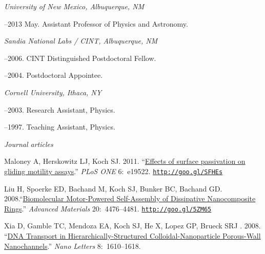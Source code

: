 \documentclass[11pt]{article}
\begin{document}
\noindent\emph{University of New Mexico, Albuquerque, NM \vspace{0.01in}}

–2013 May. Assistant Professor of Physics and Astronomy.      

\medskip
\noindent\emph{Sandia National Labs / CINT, Albuquerque, NM \vspace{0.01in}}

–2006. CINT Distinguished Postdoctoral Fellow.

–2004. Postdoctoral Appointee.

\medskip

\noindent\emph{Cornell University, Ithaca, NY \vspace{0.01in}}

–2003. Research Assistant, Physics.

–1997. Teaching Assistant, Physics.

\bigskip

 
\medskip
\noindent\emph{Journal articles \vspace{0.05in}}
 

\ind Maloney A, Herskowitz LJ, Koch SJ. 2011. ``\href{http://goo.gl/SFHEs}{Effects of surface passivation on gliding motility assays}.'' \emph{PLoS ONE} 6:~e19522. {\scriptsize  \texttt{\href{http://goo.gl/SFHEs}{http://goo.gl/SFHEs}}}


\ind Liu H, Spoerke ED, Bachand M, Koch SJ, Bunker BC, Bachand GD. 2008.\newline ``\href{http://goo.gl/5ZM65}{Biomolecular Motor-Powered Self-Assembly of Dissipative Nanocomposite Rings}.'' \emph{Advanced Materials} 20:~4476–4481. {\scriptsize  \texttt{\href{http://goo.gl/5ZM65}{http://goo.gl/5ZM65}}}


\ind Xia D, Gamble TC, Mendoza EA, Koch SJ, He X, Lopez GP, Brueck SRJ . 2008. ``\href{http://goo.gl/F0RiL}{DNA Transport in Hierarchically-Structured Colloidal-Nanoparticle \newline Porous-Wall Nanochannels}.''
 \emph{Nano Letters} 8:~1610–1618. 
\end{document}
